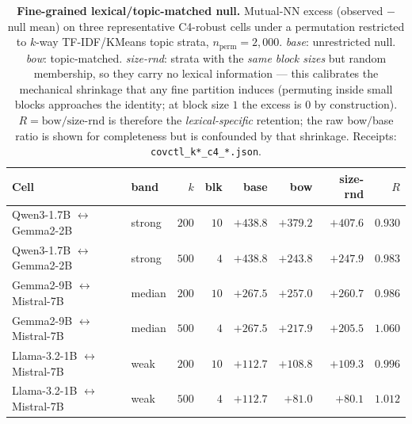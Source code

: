 \begin{table}[h]
\centering
\caption{\textbf{Fine-grained lexical/topic-matched null.} Mutual-NN excess (observed $-$ null mean) on three representative C4-robust cells under a permutation restricted to $k$-way TF-IDF/KMeans topic strata, $n_{\text{perm}}{=}2{,}000$. \emph{base}: unrestricted null. \emph{bow}: topic-matched. \emph{size-rnd}: strata with the \emph{same block sizes} but random membership, so they carry no lexical information --- this calibrates the mechanical shrinkage that any fine partition induces (permuting inside small blocks approaches the identity; at block size $1$ the excess is $0$ by construction). $R=\text{bow}/\text{size-rnd}$ is therefore the \emph{lexical-specific} retention; the raw bow$/$base ratio is shown for completeness but is confounded by that shrinkage. Receipts: \texttt{covctl\_k*\_c4\_*.json}.}
\label{tab:covctl}
\footnotesize
\setlength{\tabcolsep}{4pt}
\begin{tabular}{llrrrrrr}
\toprule
Cell & band & $k$ & blk & base & bow & size-rnd & $R$ \\
\midrule
Qwen3-1.7B $\leftrightarrow$ Gemma2-2B & strong & $200$ & $10$ & $+438.8$ & $+379.2$ & $+407.6$ & $0.930$ \\
Qwen3-1.7B $\leftrightarrow$ Gemma2-2B & strong & $500$ & $4$ & $+438.8$ & $+243.8$ & $+247.9$ & $0.983$ \\
\midrule
Gemma2-9B $\leftrightarrow$ Mistral-7B & median & $200$ & $10$ & $+267.5$ & $+257.0$ & $+260.7$ & $0.986$ \\
Gemma2-9B $\leftrightarrow$ Mistral-7B & median & $500$ & $4$ & $+267.5$ & $+217.9$ & $+205.5$ & $1.060$ \\
\midrule
Llama-3.2-1B $\leftrightarrow$ Mistral-7B & weak & $200$ & $10$ & $+112.7$ & $+108.8$ & $+109.3$ & $0.996$ \\
Llama-3.2-1B $\leftrightarrow$ Mistral-7B & weak & $500$ & $4$ & $+112.7$ & $+81.0$ & $+80.1$ & $1.012$ \\
\bottomrule
\end{tabular}
\end{table}

